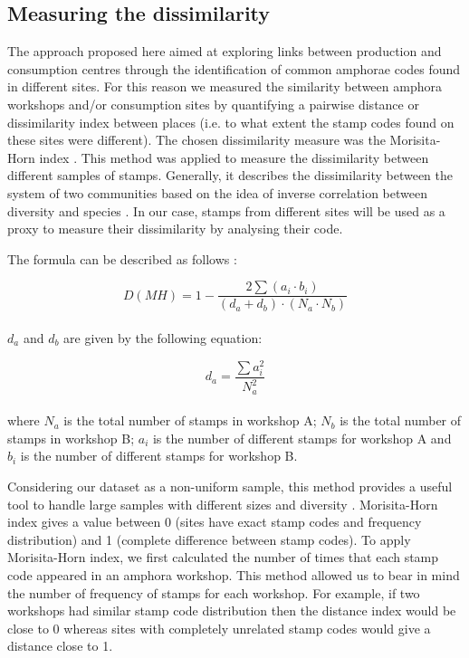 \subsection{Measuring the dissimilarity}
\label{sec:5}

The approach proposed here aimed at exploring links between production and consumption centres through the identification of common amphorae codes found in different sites. For this reason we measured the similarity between amphora workshops and/or consumption sites by quantifying a pairwise distance or dissimilarity index between places (i.e. to what extent the stamp codes found on these sites were different). The chosen dissimilarity measure was the Morisita-Horn index \citep{morisita_measuring_1959, horn_measurement_1966}. This method was applied to measure the dissimilarity between different samples of stamps. Generally, it describes the dissimilarity between the system of two communities based on the idea of inverse correlation between diversity and species \citep{magurran_why_1988}. In our case, stamps from different sites will be used as a proxy to measure their dissimilarity by analysing their code. 

The formula can be described as follows \citep{magurran_measuring_2013}:

\begin{equation}
D(MH) = 1- \frac{2 \sum(a_{i} \cdot b_{i})}{(d_{a} + d_{b}) \cdot (N_{a} \cdot N_{b})}
\end{equation} \\

$d_{a}$ and $d_{b}$ are given by the following equation:

\begin{equation}
d_{a} = \frac{\sum a_{i}^{2}}{N_{a}^{2}} 
\end{equation} \\

where $N_{a}$ is the total number of stamps in workshop A; $N_{b}$ is the total number of stamps in workshop B; $a_{i}$ is the number of different stamps for workshop A and $b_{i}$ is the number of different stamps for workshop B.

Considering our dataset as a non-uniform sample, this method provides a useful tool to handle large samples with different sizes and diversity \citep{wolda_similarity_1981}. Morisita-Horn index gives a value between 0 (sites have exact stamp codes and frequency distribution) and 1 (complete difference between stamp codes). To apply Morisita-Horn index, we first calculated the number of times that each stamp code appeared in an amphora workshop. 
This method allowed us to bear in mind the number of frequency of stamps for each workshop. For example, if two workshops had similar stamp code distribution then the distance index would be close to 0 whereas sites with completely unrelated stamp codes would give a distance close to 1.


